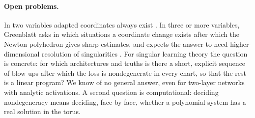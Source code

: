 \begin{refsection}
\paragraph{Open problems.} In two variables adapted coordinates always exist \parencite{IkromovMuller2011}. In three or more variables, Greenblatt asks in which situations a coordinate change exists after which the Newton polyhedron gives sharp estimates, and expects the answer to need higher-dimensional resolution of singularities \parencite[Section~1]{Greenblatt2010}. For singular learning theory the question is concrete: for which architectures and truths is there a short, explicit sequence of blow-ups after which the loss is nondegenerate in every chart, so that the rest is a linear program? We know of no general answer, even for two-layer networks with analytic activations. A second question is computational: deciding nondegeneracy means deciding, face by face, whether a polynomial system has a real solution in the torus.


\end{refsection}
